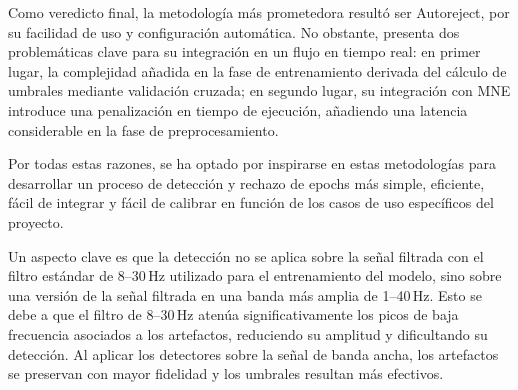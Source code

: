 Como veredicto final, la metodología más prometedora resultó ser Autoreject, por su facilidad de uso y configuración automática. No obstante, presenta dos problemáticas clave para su integración en un flujo en tiempo real: en primer lugar, la complejidad añadida en la fase de entrenamiento derivada del cálculo de umbrales mediante validación cruzada; en segundo lugar, su integración con MNE introduce una penalización en tiempo de ejecución, añadiendo una latencia considerable en la fase de preprocesamiento.

Por todas estas razones, se ha optado por inspirarse en estas metodologías para desarrollar un proceso de detección y rechazo de epochs más simple, eficiente, fácil de integrar y fácil de calibrar en función de los casos de uso específicos del proyecto.

Un aspecto clave es que la detección no se aplica sobre la señal filtrada con el filtro estándar de 8--30\,Hz utilizado para el entrenamiento del modelo, sino sobre una versión de la señal filtrada en una banda más amplia de 1--40\,Hz. Esto se debe a que el filtro de 8--30\,Hz atenúa significativamente los picos de baja frecuencia asociados a los artefactos, reduciendo su amplitud y dificultando su detección. Al aplicar los detectores sobre la señal de banda ancha, los artefactos se preservan con mayor fidelidad y los umbrales resultan más efectivos.

